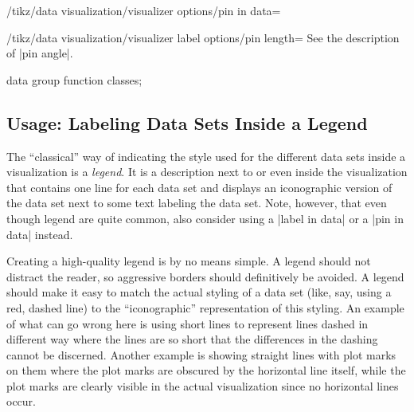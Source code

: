 \begin{key}{/tikz/data visualization/visualizer options/pin in data=}
    \begin{key}{/tikz/data visualization/visualizer label options/pin length=}
        See the description of |pin angle|.
    \end{key}
\begin{codeexample}[
    width=6.3cm,
    preamble={\usetikzlibrary{datavisualization.formats.functions}},
    pre={\tikz \datavisualization data group {function classes} = {
  data [set=log, format=function] {
    var x : interval [0.2:2.5];
    func y = ln(\value x);
  }
  data [set=lin, format=function] {
    var x : interval [-2:2.5];
    func y = 0.5*\value x;
  }
  data [set=squared, format=function] {
    var x : interval [-1.5:1.5];
    func y = \value x*\value x;
  }
  data [set=exp, format=function] {
    var x : interval [-2.5:1];
    func y = exp(\value x);
  }
};},
]
\tikz \datavisualization [
  school book axes,
  x axis={label=$x$},
  visualize as smooth line/.list={log, lin, squared, exp},
  every data set label/.append style={text colored},
  log=    {pin in data={text'=$\log x$, when=y is -1}},
  lin=    {pin in data={text=$x/2$, when=x is 2,
                        pin length=1ex}},
  squared={pin in data={text=$x^2$, when=x is 1.1,
                        pin angle=230}},
  exp=    {label in data={text=$e^x$, when=x is -2}},
  style sheet=vary hue]
data group {function classes};
\end{codeexample}
    \end{key}


\subsection{Usage: Labeling Data Sets Inside a Legend}

The ``classical'' way of indicating the style used for the different data sets
inside a visualization is a \emph{legend}. It is a description next to or even
inside the visualization that contains one line for each data set and displays
an iconographic version of the data set next to some text labeling the data
set. Note, however, that even though legend are quite common, also consider
using a |label in data| or a |pin in data| instead.

Creating a high-quality legend is by no means simple. A legend should not
distract the reader, so aggressive borders should definitively be avoided. A
legend should make it easy to match the actual styling of a data set (like,
say, using a red, dashed line) to the ``iconographic'' representation of this
styling. An example of what can go wrong here is using short lines to represent
lines dashed in different way where the lines are so short that the differences
in the dashing cannot be discerned. Another example is showing straight lines
with plot marks on them where the plot marks are obscured by the horizontal
line itself, while the plot marks are clearly visible in the actual
visualization since no horizontal lines occur.

